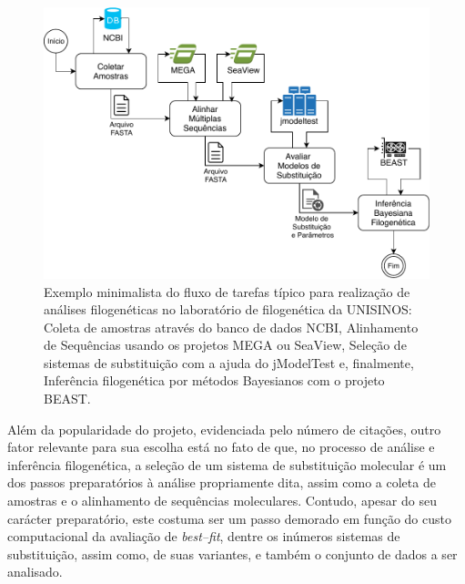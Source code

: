 \documentclass[english,brazilian]{UNISINOSmonografia} %
\newcommand\defaultFigureWidth{0.9}
\begin{document}
\begin{figure}[tb]
	\centering%
	\begin{minipage}{\defaultFigureWidth\textwidth}
		\caption[Exemplo minimalista do fluxo de tarefas típico para realização de análises filogenéticas no laboratório de filogenética da UNISINOS]{Exemplo minimalista do fluxo de tarefas típico para realização de análises filogenéticas no laboratório de filogenética da UNISINOS: Coleta de amostras através do banco de dados NCBI, Alinhamento de Sequências usando os projetos MEGA ou SeaView, Seleção de sistemas de substituição com a ajuda do jModelTest e, finalmente, Inferência filogenética por métodos Bayesianos com o projeto BEAST.}
		\label{fig:modelo-workflow-unisinos}
		\vspace{1ex}
		\includegraphics[width=\textwidth]{workflow-biologia}
	\end{minipage}
\end{figure}


Além da popularidade do projeto, evidenciada pelo número de citações, outro fator relevante para sua escolha está no fato de que, no processo de análise e inferência filogenética, a seleção de um sistema de substituição molecular é um dos passos preparatórios à análise propriamente dita, assim como a coleta de amostras e o alinhamento de sequências moleculares.
Contudo, apesar do seu carácter preparatório, este costuma ser um passo demorado em função do custo computacional da avaliação de \textit{best--fit}, dentre os inúmeros sistemas de substituição, assim como, de suas variantes, e também o conjunto de dados a ser analisado.
\end{document}
